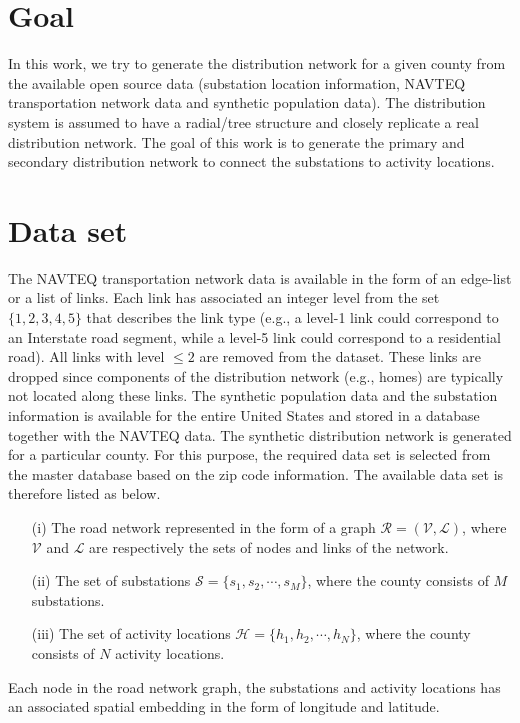 \section{Goal}\label{sec:goal}
In this work, we try to generate the distribution network for a given county from the available open source data (substation location information, NAVTEQ transportation network data and synthetic population data). The distribution system is assumed to have a radial/tree structure and closely replicate a real distribution network. The goal of this work is to generate the primary and secondary distribution network to connect the substations to activity locations.

\section{Data set}\label{sec:dataset}
The NAVTEQ transportation network data is available in the form of an edge-list or a list of links. Each link has associated an integer level from the set $\{1,2,3,4,5\}$ that describes the link type (e.g., a level-1 link could correspond to an Interstate road segment, while a level-5 link could correspond to a residential road). All links with level $\leq2$ are removed from the dataset. These links are dropped since	components of the distribution network (e.g., homes) are typically not located along these links. The synthetic population data and the substation information is available for the entire United States and stored in a database together with the NAVTEQ data. The synthetic distribution network is generated for a particular county. For this purpose, the required data set is selected from the master database based on the zip code information. The available data set is therefore listed as below.
\begin{enumerate}
	\item[(i)] The road network represented in the form of a graph $\mathcal{R}=(\mathcal{V},\mathcal{L})$, where $\mathcal{V}$ and $\mathcal{L}$ are respectively the sets of nodes and links of the network. 
	\item[(ii)] The set of substations $\mathcal{S}=\{s_1,s_2,\cdots,s_M\}$, where the county consists of $M$ substations.
	\item[(iii)] The set of activity locations $\mathcal{H}=\{h_1,h_2,\cdots,h_N\}$, where the county consists of $N$ activity locations.
\end{enumerate}
Each node in the road network graph, the substations and activity locations has an associated spatial embedding in the form of longitude and latitude.

